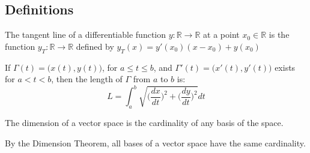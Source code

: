 \documentclass[crop=false,class=book,oneside]{standalone}
\begin{document}
    \subsection{Definitions}
        \begin{definition*}
                The tangent line of a differentiable function
                $y:\mathbb{R}\rightarrow\mathbb{R}$ at a point
                $x_{0}\in\mathbb{R}$ is the function
                $y_{T}:\mathbb{R}\rightarrow\mathbb{R}$ defined by
                $y_{T}(x)=y'(x_0)(x-x_0)+y(x_0)$ 
            \end{definition*}
        \begin{definition*}
            If $\Gamma(t)=\big(x(t),y(t)\big)$, for $a\leq t\leq b$,
            and $\Gamma'(t)=\big(x'(t),y'(t)\big)$ exists for
            $a<t<b$, then the length of $\Gamma$ from $a$ to $b$ is:
            \begin{equation}
                L=\int_{a}^{b}\sqrt{
                    \bigg(\frac{dx}{dt}\bigg)^{2}+
                    \bigg(\frac{dy}{dt}\bigg)^{2}
                }dt
            \end{equation}
        \end{definition*}
        \begin{definition*}
            The dimension of a vector space is the cardinality of
            any basis of the space. 
        \end{definition*}
        \begin{remark*}
            By the Dimension Theorem, all bases of a vector space
            have the same cardinality.
        \end{remark*}
\end{document}
